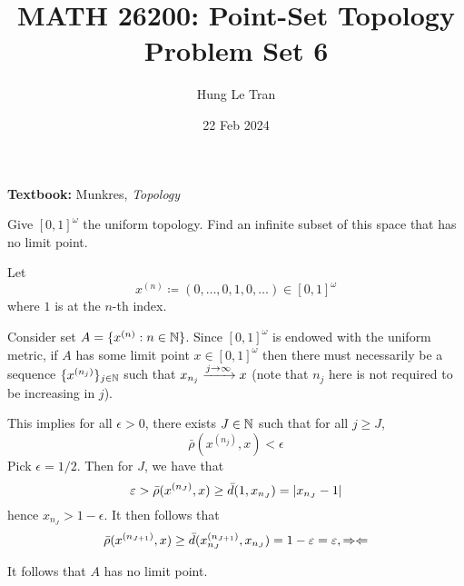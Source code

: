 \documentclass[a4paper, 10pt]{article}
\title{MATH 26200: Point-Set Topology \\ \large Problem Set 6}
\date{22 Feb 2024}
\author{Hung Le Tran}
\begin{document}
\maketitle
\setcounter{section}{6}
\textbf{Textbook:} Munkres, \textit{Topology}
\begin{problem} [28.1 \done]
    Give $[0, 1]^{\omega}$ the uniform topology. Find an infinite subset of this space that has no limit point.
\end{problem}
\begin{solution}
    Let \begin{equation*}
    x^{(n)} \coloneqq (0, \ldots, 0, 1, 0, \ldots) \in [0, 1]^\omega
    \end{equation*}
    where $1$ is at the $n$-th index.

    Consider set $A = \{x^{(n)} : n \in \mathbb{N}\}$. Since $[0, 1]^\omega$ is endowed with the uniform metric, if $A$ has some limit point $x \in [0, 1]^\omega$ then there must necessarily be a sequence $\{x^{(n_j)}\}_{j \in \mathbb{N}}$ such that $x_{n_j} \xrightarrow{j \to \infty} x$ (note that $n_j$ here is not required to be increasing in $j$).

    This implies for all $\epsilon > 0$, there exists $J \in \mathbb{N}$ such that for all $j \geq J$, \begin{equation*}
    \bar{\rho}(x^{(n_j)}, x) < \epsilon
    \end{equation*}
    Pick $\epsilon = 1/2$. Then for $J$, we have that \begin{equation*}
        \varepsilon > \bar{\rho}(x^{(n_J)}, x) \geq \bar{d}(1, x_{n_J}) = \lvert x_{n_J} - 1\rvert
    \end{equation*}
    hence $x_{n_J}> 1 - \epsilon$. It then follows that
    \begin{equation*}
    \bar{\rho}(x^{(n_{J+1})}, x) \geq \bar{d}(x^{(n_{J+1})}_{n_{J}}, x_{n_J}) = 1 - \varepsilon = \varepsilon, \Rightarrow\Leftarrow
    \end{equation*}

    It follows that $A$ has no limit point.
\end{solution}
\end{document}
